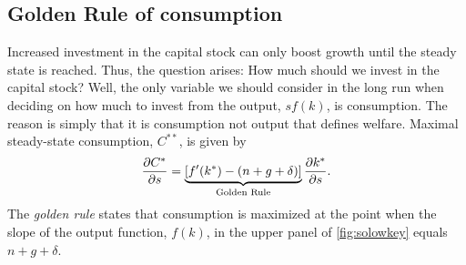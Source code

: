 \pbn
\subsection{Golden Rule of consumption}
Increased investment in the capital stock can only boost growth until the steady state is reached. Thus, the question arises:  How much should we invest in the capital stock? Well, the only variable we should consider in the long run when deciding on how much to invest from the output, $sf(k)$, is consumption.  The reason is simply that it is consumption not output that defines welfare. Maximal steady-state consumption, $C^{**}$, is given by 
\begin{align}
	\frac{\partial C^*}{\partial s}=\underbrace{\left[ f'(k^*)-(n+g+\delta)\right]}_{\textnormal{Golden Rule}}\frac{\partial k^*}{\partial s}.
\end{align}
The \textit{golden rule} states that consumption is maximized at the point when the slope of the output function, $f(k)$, in the upper panel of \autoref{fig:solowkey} equals $n+g+\delta$.



%


